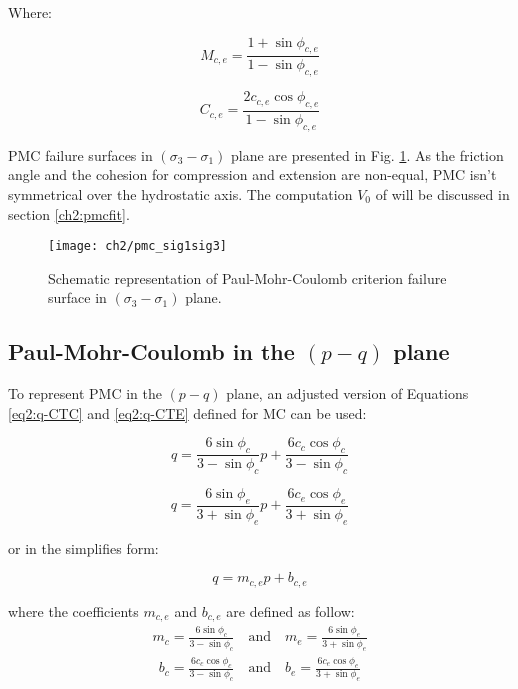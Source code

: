 Where:

\begin{equation}\label{eq2:PMC_sig1sig3_Mce}
    M_{c,e} = \frac{1+\sin \phi_{c,e}}{1-\sin \phi_{c,e}}
\end{equation}

\begin{equation}\label{eq2:PMC_sig1sig3_Cce}
    C_{c,e} = \frac{2c_{c,e}\cos \phi_{c,e}}{1-\sin \phi_{c,e}}
\end{equation}

PMC failure surfaces in $(\sigma_3 -\sigma_1)$ plane are presented in Fig. \ref{fig2:pmc_sig1sig3}. As the friction angle and the cohesion for compression and extension are non-equal, PMC isn’t symmetrical over the hydrostatic axis. The computation $V_0$ of  will be discussed in section \ref{ch2:pmcfit}. 


\begin{figure}[tb]
    \centering
    \texttt{[image: ch2/pmc\_sig1sig3]}
    \caption{Schematic representation of Paul-Mohr-Coulomb criterion failure surface in $(\sigma_3 -\sigma_1)$ plane.}
    \label{fig2:pmc_sig1sig3}
\end{figure} 

\subsection{Paul-Mohr-Coulomb in the \texorpdfstring{$(p-q)$}{p-q} plane}

To represent PMC in the $(p-q)$ plane, an adjusted version of Equations \ref{eq2:q-CTC} and \ref{eq2:q-CTE} defined for MC can be used:

\begin{equation}\label{eq2:pmc-q-CTC}
    q=\frac{6 \sin \phi_{c}}{3-\sin \phi_{c}} p+\frac{6 c_{c} \cos \phi_{c}}{3-\sin \phi_{c}}
\end{equation}

\begin{equation}\label{eq2:pmc-q-CTE}
    q=\frac{6 \sin \phi_{e}}{3+\sin \phi_{e}} p+\frac{6 c_{e} \cos  \phi_{e}}{3+\sin \phi_{e}}
\end{equation}

or in the simplifies form:

\begin{equation}\label{eq2:PMC_pq}
    q = m_{c,e}p+b_{c,e}
\end{equation}

where the coefficients $m_{c,e}$ and $b_{c,e}$ are defined as follow:
\begin{align}\label{eq2:pmc_m_pq}
    m_c=\frac{6 \sin \phi_{c}}{3-\sin \phi_{c}} \quad \textrm{and} \quad m_e=\frac{6 \sin \phi_{e}}{3+\sin \phi_{e}} 
\end{align}
\begin{align}\label{eq2:pmc_b_pq}
    b_c=\frac{6 c_{c} \cos \phi_{c}}{3-\sin \phi_{c}}\quad \textrm{and} \quad b_e=\frac{6 c_{e} \cos \phi_{e}}{3+\sin \phi_{e}}
\end{align}

